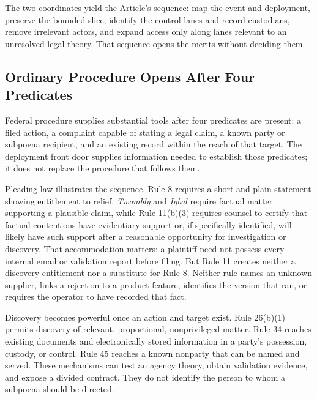 The two coordinates yield the Article's sequence: map the event and deployment, preserve the bounded slice, identify the control lanes and record custodians, remove irrelevant actors, and expand access only along lanes relevant to an unresolved legal theory. That sequence opens the merits without deciding them.

\subsection{Ordinary Procedure Opens After Four Predicates}
\label{sec:ordinary-procedure}

Federal procedure supplies substantial tools after four predicates are present: a filed action, a complaint capable of stating a legal claim, a known party or subpoena recipient, and an existing record within the reach of that target. The deployment front door supplies information needed to establish those predicates; it does not replace the procedure that follows them.

Pleading law illustrates the sequence. Rule 8 requires a short and plain statement showing entitlement to relief. \emph{Twombly} and \emph{Iqbal} require factual matter supporting a plausible claim, while Rule 11(b)(3) requires counsel to certify that factual contentions have evidentiary support or, if specifically identified, will likely have such support after a reasonable opportunity for investigation or discovery. That accommodation matters: a plaintiff need not possess every internal email or validation report before filing. But Rule 11 creates neither a discovery entitlement nor a substitute for Rule 8. Neither rule names an unknown supplier, links a rejection to a product feature, identifies the version that ran, or requires the operator to have recorded that fact.

Discovery becomes powerful once an action and target exist. Rule 26(b)(1) permits discovery of relevant, proportional, nonprivileged matter. Rule 34 reaches existing documents and electronically stored information in a party's possession, custody, or control. Rule 45 reaches a known nonparty that can be named and served. These mechanisms can test an agency theory, obtain validation evidence, and expose a divided contract. They do not identify the person to whom a subpoena should be directed.

